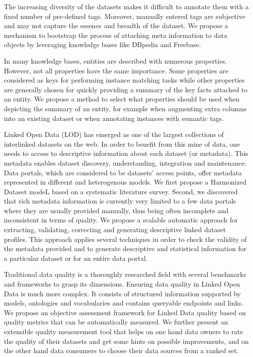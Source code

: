 The increasing diversity of the datasets makes it difficult to annotate them with a fixed number of pre-defined tags. Moreover, manually entered tags are subjective and may not capture the essence and breadth of the dataset. We propose a mechanism to bootstrap the process of attaching meta information to data objects by leveraging knowledge bases like DBpedia and Freebase.

In many knowledge bases, entities are described with numerous properties. However, not all properties have the same importance. Some properties are considered as keys for performing instance matching tasks while other properties are generally chosen for quickly providing a summary of the key facts attached to an entity. We propose a method to select what properties should be used when depicting the summary of an entity, for example when augmenting extra columns into an existing dataset or when annotating instances with semantic tags.

Linked Open Data (LOD) has emerged as one of the largest collections of interlinked datasets on the web. In order to benefit from this mine of data, one needs to access to descriptive information about each dataset (or metadata). This metadata enables dataset discovery, understanding, integration and maintenance. Data portals, which are considered to be datasets' access points, offer metadata represented in different and heterogenous models. We first propose a Harmonized Dataset modeL based on a systematic literature survey. Second, we discovered that rich metadata information is currently very limited to a few data portals where they are usually provided manually, thus being often incomplete and inconsistent in terms of quality. We propose a scalable automatic approach for extracting, validating, correcting and generating descriptive linked dataset profiles. This approach applies several techniques in order to check the validity of the metadata provided and to generate descriptive and statistical information for a particular dataset or for an entire data portal.

Traditional data quality is a thoroughly researched field with several benchmarks and frameworks to grasp its dimensions. Ensuring data quality in Linked Open Data is much more complex. It consists of structured information supported by models, ontologies and vocabularies and contains queryable endpoints and links. We propose an objective assessment framework for Linked Data quality based on quality metrics that can be automatically measured. We further present an extensible quality measurement tool that helps on one hand data owners to rate the quality of their datasets and get some hints on possible improvements, and on the other hand data consumers to choose their data sources from a ranked set.

